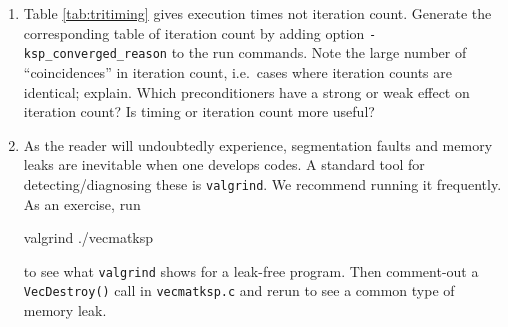 \begin{enumerate}
\item Table \ref{tab:tritiming} gives execution times not iteration count.  Generate the corresponding table of \pKSP iteration count by adding option \verb|-ksp_converged_reason| to the run commands.  Note the large number of ``coincidences'' in iteration count, i.e.~cases where iteration counts are identical; explain.  Which preconditioners have a strong or weak effect on iteration count?  Is timing or iteration count more useful?

\item As the reader will undoubtedly experience, segmentation faults and memory leaks are inevitable when one develops \PETSc codes.  A standard tool for detecting/diagnosing these is \texttt{valgrind}.  We recommend running it frequently.  As an exercise, run
\begin{cline}
valgrind ./vecmatksp
\end{cline}
to see what \texttt{valgrind} shows for a leak-free program.  Then comment-out a \texttt{VecDestroy()} call in \texttt{vecmatksp.c} and rerun to see a common type of memory leak.


\end{enumerate}
